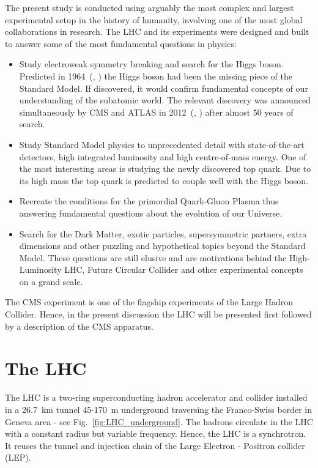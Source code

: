 \label{sec:experimental_setup}

The present study is conducted using arguably the most complex and largest experimental setup in the history of humanity, involving one of the most global collaborations in research. The LHC and its experiments were designed and built to answer some of the most fundamental questions in physics:

\begin{itemize}
\item Study electroweak symmetry breaking and search for the Higgs boson. Predicted in 1964~(\cite{Higgs:1964ia}, \cite{Englert:1964et}) the Higgs boson had been the missing piece of the Standard Model. If discovered, it would confirm fundamental concepts of our understanding of the subatomic world. The relevant discovery was announced simultaneously by CMS and ATLAS in 2012~(\cite{Chatrchyan:2012xdj}, \cite{Aad:2012tfa}) after almost 50 years of search.
\item Study Standard Model physics to unprecedented detail with state-of-the-art detectors, high integrated luminosity and high centre-of-mass energy. One of the most interesting areas is studying the newly discovered top quark. Due to its high mass the top quark is predicted to couple well with the Higgs boson.
\item Recreate the conditions for the primordial Quark-Gluon Plasma thus answering fundamental questions about the evolution of our Universe.
\item Search for the Dark Matter, exotic particles, supersymmetric partners, extra dimensions and other puzzling and hypothetical topics beyond the Standard Model. These questions are still elusive and are motivations behind the High-Luminosity LHC, Future Circular Collider and other experimental concepts on a grand scale.
\end {itemize}

The CMS experiment is one of the flagship experiments of the Large Hadron Collider. Hence, in the present discussion the LHC will be presented first followed by a description of the CMS apparatus.

\section{The LHC}

The LHC is a two-ring superconducting hadron accelerator and collider installed in a 26.7~km tunnel 45-170~m underground traversing the Franco-Swiss border in Geneva area - see Fig.~\ref{fig:LHC_underground}. The hadrons circulate in the LHC with a constant radius but variable frequency. Hence, the LHC is a synchrotron. It reuses the tunnel and injection chain of the Large Electron - Positron collider (LEP).

